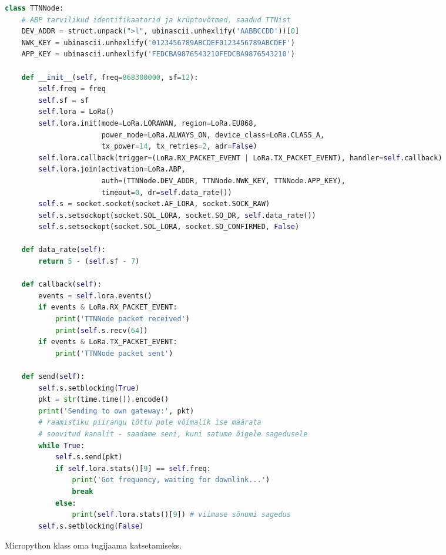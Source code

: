 \documentclass[12pt]{article}
\begin{document}
    \begin{figure}[h]
    \begin{spacing}{0.8}
        \begin{lstlisting}[language=Python]
class TTNNode:
    # ABP tarvilikud identifikaatorid ja krüptovõtmed, saadud TTNist
    DEV_ADDR = struct.unpack(">l", ubinascii.unhexlify('AABBCCDD'))[0]
    NWK_KEY = ubinascii.unhexlify('0123456789ABCDEF0123456789ABCDEF')
    APP_KEY = ubinascii.unhexlify('FEDCBA9876543210FEDCBA9876543210')

    def __init__(self, freq=868300000, sf=12):
        self.freq = freq
        self.sf = sf
        self.lora = LoRa()
        self.lora.init(mode=LoRa.LORAWAN, region=LoRa.EU868,
                       power_mode=LoRa.ALWAYS_ON, device_class=LoRa.CLASS_A,
                       tx_power=14, tx_retries=2, adr=False)
        self.lora.callback(trigger=(LoRa.RX_PACKET_EVENT | LoRa.TX_PACKET_EVENT), handler=self.callback)
        self.lora.join(activation=LoRa.ABP,
                       auth=(TTNNode.DEV_ADDR, TTNNode.NWK_KEY, TTNNode.APP_KEY),
                       timeout=0, dr=self.data_rate())
        self.s = socket.socket(socket.AF_LORA, socket.SOCK_RAW)
        self.s.setsockopt(socket.SOL_LORA, socket.SO_DR, self.data_rate())
        self.s.setsockopt(socket.SOL_LORA, socket.SO_CONFIRMED, False)

    def data_rate(self):
        return 5 - (self.sf - 7)

    def callback(self):
        events = self.lora.events()
        if events & LoRa.RX_PACKET_EVENT:
            print('TTNNode packet received')
            print(self.s.recv(64))
        if events & LoRa.TX_PACKET_EVENT:
            print('TTNNode packet sent')

    def send(self):
        self.s.setblocking(True)
        pkt = str(time.time()).encode()
        print('Sending to own gateway:', pkt)
        # raamistiku piirangu tõttu pole võimalik ise määrata
        # soovitud kanalit - saadame seni, kuni satume õigele sagedusele
        while True:
            self.s.send(pkt)
            if self.lora.stats()[9] == self.freq:
                print('Got frequency, waiting for downlink...')
                break
            else:
                print(self.lora.stats()[9]) # viimase sõnumi sagedus
        self.s.setblocking(False)

    \end{lstlisting}
    \end{spacing}
    \caption{Micropython klass oma tugijaama katsetamiseks.}
    \label{fig:codettn}
    \end{figure}
\end{document}
